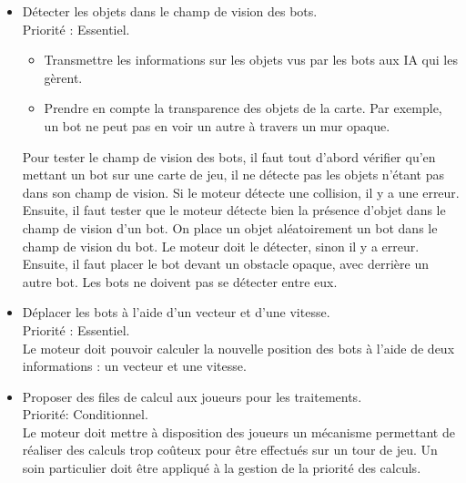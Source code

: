 \documentclass[french]{article}
\begin{document}
\begin{itemize}
                
        \item Détecter les objets dans le champ de vision des bots. \\
            Priorité : Essentiel.
            \begin{itemize}
                \item Transmettre les informations sur les objets vus par les bots aux IA qui les gèrent.
                \item Prendre en compte la transparence des objets de la carte. Par exemple, un bot ne peut pas en voir un autre à travers un mur opaque.\\
            \end{itemize}
            Pour tester le champ de vision des bots, il faut tout d'abord vérifier qu'en mettant un bot sur une carte de jeu, il ne détecte pas les objets n'étant pas dans son champ de vision. Si le moteur détecte une collision, il y a une erreur. \\
            
            Ensuite, il faut tester que le moteur détecte bien la présence d'objet dans le champ de vision d'un bot.
            On place un objet aléatoirement un bot dans le champ de vision du bot. Le moteur doit le détecter, sinon il y a erreur. \\
            Ensuite, il faut placer le bot devant un obstacle opaque, avec derrière un autre bot. Les bots ne doivent pas se détecter entre eux.\\
                
        \item Déplacer les bots à l'aide d'un vecteur et d'une vitesse.\\
                Priorité : Essentiel.\\
                Le moteur doit pouvoir calculer la nouvelle position des bots à l'aide de deux informations : un vecteur et une vitesse. \\
                
                
        \item Proposer des files de calcul aux joueurs pour les traitements.\\
            Priorité: Conditionnel.\\
            Le moteur doit mettre à disposition des joueurs un mécanisme permettant de réaliser des calculs trop coûteux pour être effectués sur un tour de jeu. Un soin particulier doit être appliqué à la gestion de la priorité des calculs. \\ %


\end{itemize}
\end{document}
